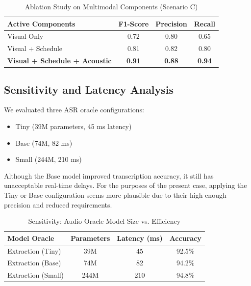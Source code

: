 \documentclass[conference]{IEEEtran}
\begin{document}
\begin{table}[htbp]
\caption{Ablation Study on Multimodal Components (Scenario C)}
\begin{center}
\begin{tabular}{lccc}
\toprule
\textbf{Active Components} & \textbf{F1-Score} & \textbf{Precision} & \textbf{Recall} \\
\midrule
Visual Only & 0.72 & 0.80 & 0.65 \\
Visual + Schedule & 0.81 & 0.82 & 0.80 \\
\textbf{Visual + Schedule + Acoustic} & \textbf{0.91} & \textbf{0.88} & \textbf{0.94} \\
\bottomrule
\end{tabular}
\end{center}
\end{table}

\subsection{Sensitivity and Latency Analysis}
We evaluated three ASR oracle configurations:
\begin{itemize}
    \item Tiny (39M parameters, 45 ms latency)
    \item Base (74M, 82 ms)
    \item Small (244M, 210 ms)
\end{itemize}

Although the Base model improved transcription accuracy, it still has unacceptable real-time delays. For the purposes of the present case, applying the Tiny or Base configuration seems more plausible due to their high enough precision and reduced requirements.

\begin{table}[htbp]
\caption{Sensitivity: Audio Oracle Model Size vs. Efficiency}
\begin{center}
\begin{tabular}{lccc}
\toprule
\textbf{Model Oracle} & \textbf{Parameters} & \textbf{Latency (ms)} & \textbf{Accuracy} \\
\midrule
Extraction (Tiny) & 39M & 45 & 92.5\% \\
Extraction (Base) & 74M & 82 & 94.2\% \\
Extraction (Small) & 244M & 210 & 94.8\% \\
\bottomrule
\end{tabular}
\end{center}
\end{table}
\end{document}
